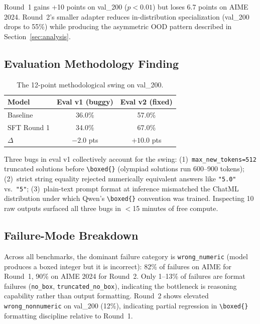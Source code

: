 \documentclass[10pt,twocolumn]{article}
\begin{document}
Round~1 gains +10 points on val\_200 ($p < 0.01$) but loses 6.7 points on AIME 2024. Round~2's smaller adapter reduces in-distribution specialization (val\_200 drops to 55\%) while producing the asymmetric OOD pattern described in Section~\ref{sec:analysis}.

\subsection{Evaluation Methodology Finding}

\begin{table}[h]
\centering
\small
\caption{The 12-point methodological swing on val\_200.}
\label{tab:diagnostic}
\vspace{2pt}
\begin{tabular}{lcc}
\toprule
\textbf{Model} & \textbf{Eval v1 (buggy)} & \textbf{Eval v2 (fixed)} \\
\midrule
Baseline & 36.0\% & 57.0\% \\
SFT Round 1 & 34.0\% & 67.0\% \\
\midrule
$\Delta$ & $-2.0$ pts & $+10.0$ pts \\
\bottomrule
\end{tabular}
\end{table}

Three bugs in eval v1 collectively account for the swing: (1)~\texttt{max\_new\_tokens=512} truncated solutions before \texttt{\textbackslash boxed\{\}} (olympiad solutions run 600--900 tokens); (2)~strict string equality rejected numerically equivalent answers like \texttt{"5.0"} vs.\ \texttt{"5"}; (3)~plain-text prompt format at inference mismatched the ChatML distribution under which Qwen's \texttt{\textbackslash boxed\{\}} convention was trained. Inspecting 10 raw outputs surfaced all three bugs in $<$15 minutes of free compute.

\subsection{Failure-Mode Breakdown}

Across all benchmarks, the dominant failure category is \texttt{wrong\_numeric} (model produces a boxed integer but it is incorrect): 82\% of failures on AIME for Round~1, 90\% on AIME 2024 for Round~2. Only 1--13\% of failures are format failures (\texttt{no\_box}, \texttt{truncated\_no\_box}), indicating the bottleneck is reasoning capability rather than output formatting. Round~2 shows elevated \texttt{wrong\_nonnumeric} on val\_200 (12\%), indicating partial regression in \texttt{\textbackslash boxed\{\}} formatting discipline relative to Round~1.
\end{document}
